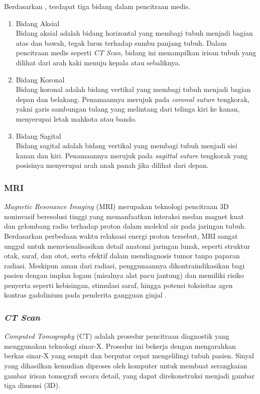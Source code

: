 Berdasarkan \textcite{radiologykey2015brain}, terdapat tiga bidang dalam pencitraan medis.
\begin{enumerate}
	
	\item Bidang Aksial\\
	Bidang aksial adalah bidang horizontal yang membagi tubuh menjadi bagian atas dan bawah, tegak lurus terhadap sumbu panjang tubuh. Dalam pencitraan medis seperti \textit{CT Scan}, bidang ini menampilkan irisan tubuh yang dilihat dari arah kaki menuju kepala atau sebaliknya.
	
	\item Bidang Koronal\\
	Bidang koronal adalah bidang vertikal yang membagi tubuh menjadi bagian depan dan belakang. Penamaannya merujuk pada \textit{coronal suture} tengkorak, yakni garis sambungan tulang yang melintang dari telinga kiri ke kanan, menyerupai letak mahkota atau bando.
	
	\item Bidang Sagital\\
	Bidang sagital adalah bidang vertikal yang membagi tubuh menjadi sisi kanan dan kiri. Penamaannya merujuk pada \textit{sagittal suture} tengkorak yang posisinya menyerupai arah anak panah jika dilihat dari depan.
\end{enumerate}

\subsubsection{MRI}
\textit{Magnetic Resonance Imaging} (MRI) merupakan teknologi pencitraan 3D noninvasif beresolusi tinggi yang memanfaatkan interaksi medan magnet kuat dan gelombang radio terhadap proton dalam molekul air pada jaringan tubuh. Berdasarkan perbedaan waktu relaksasi energi proton tersebut, MRI sangat unggul untuk memvisualisasikan detail anatomi jaringan lunak, seperti struktur otak, saraf, dan otot, serta efektif dalam mendiagnosis tumor tanpa paparan radiasi. Meskipun aman dari radiasi, penggunaannya dikontraindikasikan bagi pasien dengan implan logam (misalnya alat pacu jantung) dan memiliki risiko penyerta seperti kebisingan, stimulasi saraf, hingga potensi toksisitas agen kontras gadolinium pada penderita gangguan ginjal \autocite{nibib2025mri}.

\subsubsection{\textit{CT Scan}}
\textit{Computed Tomography} (CT) adalah prosedur pencitraan diagnostik yang menggunakan teknologi sinar-X. Prosedur ini bekerja dengan mengarahkan berkas sinar-X yang sempit dan berputar cepat mengelilingi tubuh pasien. Sinyal yang dihasilkan kemudian diproses oleh komputer untuk membuat serangkaian gambar irisan tomografi secara detail, yang dapat direkonstruksi menjadi gambar tiga dimensi (3D).

